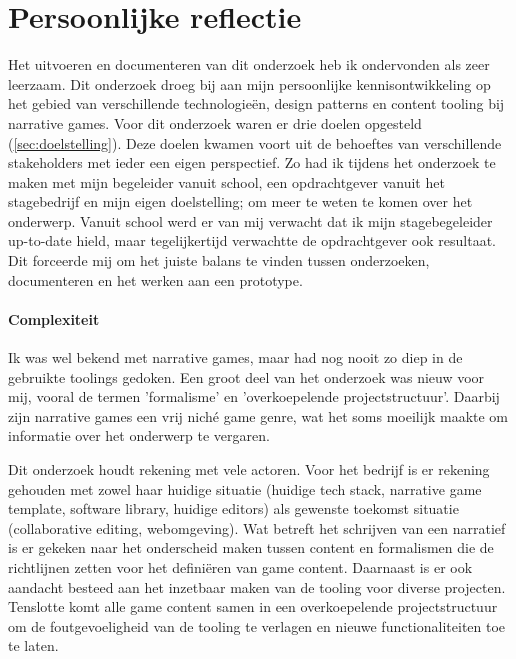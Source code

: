 \chapter{Persoonlijke reflectie}
\label{ch:reflection}
Het uitvoeren en documenteren van dit onderzoek heb ik ondervonden als zeer leerzaam. Dit onderzoek droeg bij aan mijn persoonlijke kennisontwikkeling op het gebied van verschillende technologieën, design patterns en content tooling bij narrative games. Voor dit onderzoek waren er drie doelen opgesteld (\autoref{sec:doelstelling}). Deze doelen kwamen voort uit de behoeftes van verschillende stakeholders met ieder een eigen perspectief. Zo had ik tijdens het onderzoek te maken met mijn begeleider vanuit school, een opdrachtgever vanuit het stagebedrijf en mijn eigen doelstelling; om meer te weten te komen over het onderwerp. Vanuit school werd er van mij verwacht dat ik mijn stagebegeleider up-to-date hield, maar tegelijkertijd verwachtte de opdrachtgever ook resultaat. Dit forceerde mij om het juiste balans te vinden tussen onderzoeken, documenteren en het werken aan een prototype.

\subsubsection{Complexiteit}
Ik was wel bekend met narrative games, maar had nog nooit zo diep in de gebruikte toolings gedoken. Een groot deel van het onderzoek was nieuw voor mij, vooral de termen 'formalisme' en 'overkoepelende projectstructuur'. Daarbij zijn narrative games een vrij niché game genre, wat het soms moeilijk maakte om informatie over het onderwerp te vergaren. 

Dit onderzoek houdt rekening met vele actoren. Voor het bedrijf is er rekening gehouden met zowel haar huidige situatie (huidige tech stack, narrative game template, software library, huidige editors) als gewenste toekomst situatie (collaborative editing, webomgeving). Wat betreft het schrijven van een narratief is er gekeken naar het onderscheid maken tussen content en formalismen die de richtlijnen zetten voor het definiëren van game content. Daarnaast is er ook aandacht besteed aan het inzetbaar maken van de tooling voor diverse projecten. Tenslotte komt alle game content samen in een overkoepelende projectstructuur om de foutgevoeligheid van de tooling te verlagen en nieuwe functionaliteiten toe te laten.

